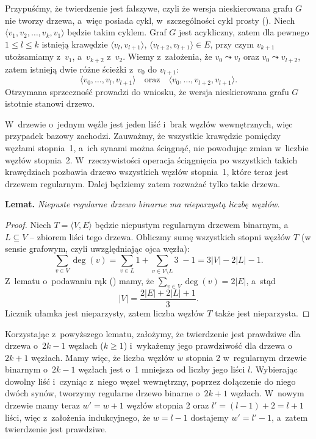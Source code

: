 \exercise %
Przypuśćmy, że twierdzenie jest fałszywe, czyli że wersja nieskierowana grafu $G$ nie tworzy drzewa, a~więc posiada cykl, w~szczególności cykl prosty (). Niech $\langle v_1,v_2,\dots,v_k,v_1\rangle$ będzie takim cyklem. Graf $G$ jest acykliczny, zatem dla pewnego $1\le l\le k$ istnieją krawędzie $\langle v_l,v_{l+1}\rangle$, $\langle v_{l+2},v_{l+1}\rangle\in E$, przy czym $v_{k+1}$ utożsamiamy z~$v_1$, a~$v_{k+2}$ z~$v_2$. Wiemy z~założenia, że $v_0\leadsto v_l$ oraz $v_0\leadsto v_{l+2}$, zatem istnieją dwie różne ścieżki z~$v_0$ do $v_{l+1}$:
\[
	\langle v_0,\dots,v_l,v_{l+1}\rangle \quad\text{oraz}\quad \langle v_0,\dots,v_{l+2},v_{l+1}\rangle.
\]
Otrzymana sprzeczność prowadzi do wniosku, że wersja nieskierowana grafu $G$ istotnie stanowi drzewo.

\exercise %
W~drzewie o~jednym węźle jest jeden liść i~brak węzłów wewnętrznych, więc przypadek bazowy zachodzi. Zauważmy, że wszystkie krawędzie pomiędzy węzłami stopnia~1, a~ich synami można ściągnąć, nie powodując zmian w~liczbie węzłów stopnia~2. W~rzeczywistości operacja ściągnięcia po wszystkich takich krawędziach pozbawia drzewo wszystkich węzłów stopnia~1, które teraz jest drzewem regularnym. Dalej będziemy zatem rozważać tylko takie drzewa.

\medskip
\noindent\textsf{\textbf{Lemat.}} \textit{Niepuste regularne drzewo binarne ma nieparzystą liczbę węzłów.}
\begin{proof}
Niech $T=\langle V,E\rangle$ będzie niepustym regularnym drzewem binarnym, a~$L\subseteq V$ -- zbiorem liści tego drzewa. Obliczmy sumę wszystkich stopni węzłów $T$ (w sensie grafowym, czyli uwzględniając ojca węzła):
\[
	\sum_{v\in V}\deg(v) = \sum_{v\in L}1+\sum_{v\in V\setminus L}\!\!\!3\;-1=3|V|-2|L|-1.
\]
Z~lematu o~podawaniu rąk () mamy, że $\sum_{v\in V}\deg(v) = 2|E|$, a~stąd
\[
	|V| = \frac{2|E|+2|L|+1}{3}.
\]
Licznik ułamka jest nieparzysty, zatem liczba węzłów $T$ także jest nieparzysta.
\end{proof}

Korzystając z~powyższego lematu, założymy, że twierdzenie jest prawdziwe dla drzewa o~$2k-1$ węzłach ($k\ge1$) i~wykażemy jego prawdziwość dla drzewa o~$2k+1$ węzłach. Mamy więc, że liczba węzłów $w$ stopnia 2 w~regularnym drzewie binarnym o~$2k-1$ węzłach jest o~1 mniejsza od liczby jego liści $l$. Wybierając dowolny liść i~czyniąc z~niego węzeł wewnętrzny, poprzez dołączenie do niego dwóch synów, tworzymy regularne drzewo binarne o~$2k+1$ węzłach. W~nowym drzewie mamy teraz $w'=w+1$ węzłów stopnia 2 oraz $l'=(l-1)+2=l+1$ liści, więc z~założenia indukcyjnego, że $w=l-1$ dostajemy $w'=l'-1$, a~zatem twierdzenie jest prawdziwe.

